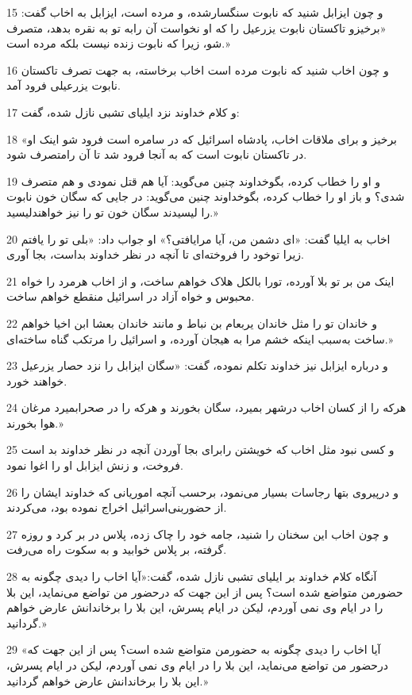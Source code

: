 \par 15 و چون ایزابل شنید که نابوت سنگسارشده، و مرده است، ایزابل به اخاب گفت: «برخیزو تاکستان نابوت یزرعیل را که او نخواست آن رابه تو به نقره بدهد، متصرف شو، زیرا که نابوت زنده نیست بلکه مرده است.»
\par 16 و چون اخاب شنید که نابوت مرده است اخاب برخاسته، به جهت تصرف تاکستان نابوت یزرعیلی فرود آمد.
\par 17 و کلام خداوند نزد ایلیای تشبی نازل شده، گفت:
\par 18 «برخیز و برای ملاقات اخاب، پادشاه اسرائیل که در سامره است فرود شو اینک او در تاکستان نابوت است که به آنجا فرود شد تا آن رامتصرف شود. 
\par 19 و او را خطاب کرده، بگوخداوند چنین می‌گوید: آیا هم قتل نمودی و هم متصرف شدی؟ و باز او را خطاب کرده، بگوخداوند چنین می‌گوید: در جایی که سگان خون نابوت را لیسیدند سگان خون تو را نیز خواهندلیسید.»
\par 20 اخاب به ایلیا گفت: «ای دشمن من، آیا مرایافتی؟» او جواب داد: «بلی تو را یافتم زیرا توخود را فروخته‌ای تا آنچه در نظر خداوند بداست، بجا آوری.
\par 21 اینک من بر تو بلا آورده، تورا بالکل هلاک خواهم ساخت، و از اخاب هرمرد را خواه محبوس و خواه آزاد در اسرائیل منقطع خواهم ساخت.
\par 22 و خاندان تو را مثل خاندان یربعام بن نباط و مانند خاندان بعشا ابن اخیا خواهم ساخت به‌سبب اینکه خشم مرا به هیجان آورده، و اسرائیل را مرتکب گناه ساخته‌ای.»
\par 23 و درباره ایزابل نیز خداوند تکلم نموده، گفت: «سگان ایزابل را نزد حصار یزرعیل خواهند خورد.
\par 24 هر‌که را از کسان اخاب درشهر بمیرد، سگان بخورند و هر‌که را در صحرابمیرد مرغان هوا بخورند.»
\par 25 و کسی نبود مثل اخاب که خویشتن رابرای بجا آوردن آنچه در نظر خداوند بد است فروخت، و زنش ایزابل او را اغوا نمود.
\par 26 و درپیروی بتها رجاسات بسیار می‌نمود، برحسب آنچه اموریانی که خداوند ایشان را از حضوربنی‌اسرائیل اخراج نموده بود، می‌کردند.
\par 27 و چون اخاب این سخنان را شنید، جامه خود را چاک زده، پلاس در بر کرد و روزه گرفته، بر پلاس خوابید و به سکوت راه می‌رفت.
\par 28 آنگاه کلام خداوند بر ایلیای تشبی نازل شده، گفت:«آیا اخاب را دیدی چگونه به حضورمن متواضع شده است؟ پس از این جهت که درحضور من تواضع می‌نماید، این بلا را در ایام وی نمی آوردم، لیکن در ایام پسرش، این بلا را برخاندانش عارض خواهم گردانید.»
\par 29 «آیا اخاب را دیدی چگونه به حضورمن متواضع شده است؟ پس از این جهت که درحضور من تواضع می‌نماید، این بلا را در ایام وی نمی آوردم، لیکن در ایام پسرش، این بلا را برخاندانش عارض خواهم گردانید.»
 
